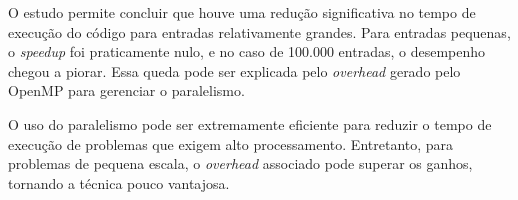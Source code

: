 O estudo permite concluir que houve uma redução significativa no tempo de execução do código para entradas relativamente grandes. Para entradas pequenas, o \textit{speedup} foi praticamente nulo, e no caso de 100.000 entradas, o desempenho chegou a piorar. Essa queda pode ser explicada pelo \textit{overhead} gerado pelo OpenMP para gerenciar o paralelismo.

\par O uso do paralelismo pode ser extremamente eficiente para reduzir o tempo de execução de problemas que exigem alto processamento. Entretanto, para problemas de pequena escala, o \textit{overhead} associado pode superar os ganhos, tornando a técnica pouco vantajosa.